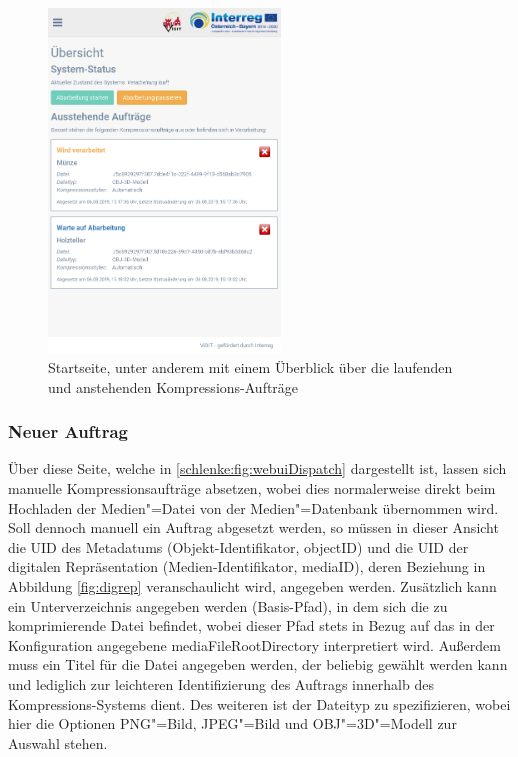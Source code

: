 \begin{figure}
\begin{center}
\includegraphics[width=0.55\textwidth]{Figures/schlenker/webui/overview.png}
\caption{Startseite, unter anderem mit einem Überblick über die laufenden und anstehenden Kompressions-Aufträge}
\label{schlenke:fig:webuiOverview}
\end{center}
\end{figure}

\subsubsection{Neuer Auftrag}

Über diese Seite, welche in \autoref{schlenke:fig:webuiDispatch} dargestellt ist, lassen sich manuelle Kompressionsaufträge absetzen, wobei dies normalerweise direkt beim Hochladen der Medien"=Datei von der Medien"=Datenbank übernommen wird. Soll dennoch manuell ein Auftrag abgesetzt werden, so müssen in dieser Ansicht die UID des Metadatums (Objekt-Identifikator, {\ttfamily objectID}) und die UID der digitalen Repräsentation (Medien-Identifikator, {\ttfamily mediaID}), deren Beziehung in Abbildung \autoref{fig:digrep} veranschaulicht wird, angegeben werden. Zusätzlich kann ein Unterverzeichnis angegeben werden (Basis-Pfad), in dem sich die zu komprimierende Datei befindet, wobei dieser Pfad stets in Bezug auf das in der Konfiguration angegebene {\ttfamily media\-File\-Root\-Directory} interpretiert wird. Außerdem muss ein Titel für die Datei angegeben werden, der beliebig gewählt werden kann und lediglich zur leichteren Identifizierung des Auftrags innerhalb des Kompressions-Systems dient. Des weiteren ist der Dateityp zu spezifizieren, wobei hier die Optionen PNG"=Bild, JPEG"=Bild und OBJ"=3D"=Modell zur Auswahl stehen. 

